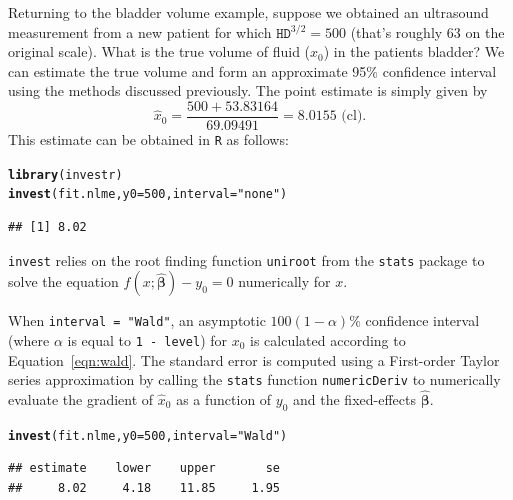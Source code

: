 \documentclass{article}\usepackage[]{graphicx}\usepackage[]{color}
\makeatletter
\newcommand{\hlnum}[1]{\textcolor[rgb]{0.686,0.059,0.569}{#1}}%
\newcommand{\hlstr}[1]{\textcolor[rgb]{0.192,0.494,0.8}{#1}}%
\newcommand{\hlstd}[1]{\textcolor[rgb]{0.345,0.345,0.345}{#1}}%
\newcommand{\hlkwc}[1]{\textcolor[rgb]{0.333,0.667,0.333}{#1}}%
\newcommand{\hlkwd}[1]{\textcolor[rgb]{0.737,0.353,0.396}{\textbf{#1}}}%
\newenvironment{kframe}{%
 \def\at@end@of@kframe{}%
 \ifinner\ifhmode%
  \def\at@end@of@kframe{\end{minipage}}%
  \begin{minipage}{\columnwidth}%
 \fi\fi%
 \def\FrameCommand##1{\hskip\@totalleftmargin \hskip-\fboxsep
 \colorbox{shadecolor}{##1}\hskip-\fboxsep
     \hskip-\linewidth \hskip-\@totalleftmargin \hskip\columnwidth}%
 \MakeFramed {\advance\hsize-\width
   \@totalleftmargin\z@ \linewidth\hsize
   \@setminipage}}%
 {\par\unskip\endMakeFramed%
 \at@end@of@kframe}
\newenvironment{knitrout}{}{} %
\makeatother
\begin{document}
Returning to the bladder volume example, suppose we obtained an ultrasound measurement from a new patient for which $\texttt{HD}^{3/2} = 500$ (that's roughly 63 on the original scale).  What is the true volume of fluid ($x_0$) in the patients bladder?  We can estimate the true volume and form an approximate 95\% confidence interval using the methods discussed previously.  The point estimate is simply given by
\[
  \widehat{x}_0 = \frac{500 + 53.83164}{69.09491} = 8.0155 \text{ (cl)}.
\]
This estimate can be obtained in \texttt{R} as follows:
\begin{knitrout}
\color{fgcolor}\begin{kframe}
\begin{alltt}
\hlkwd{library}\hlstd{(investr)}
\hlkwd{invest}\hlstd{(fit.nlme,} \hlkwc{y0} \hlstd{=} \hlnum{500}\hlstd{,} \hlkwc{interval} \hlstd{=} \hlstr{"none"}\hlstd{)}
\end{alltt}
\begin{verbatim}
## [1] 8.02
\end{verbatim}
\end{kframe}
\end{knitrout}
\texttt{invest} relies on the root finding function \texttt{uniroot} from the \texttt{stats} package to solve the equation $f\left(x; \widehat{\bm{\beta}}\right) - y_0 = 0$ numerically for $x$.  

When \texttt{interval = "Wald"}, an asymptotic $100(1-\alpha)\%$ confidence interval (where $\alpha$ is equal to \texttt{1 - level}) for $x_0$ is calculated according to Equation~\eqref{eqn:wald}. The standard error is computed using a First-order Taylor series approximation by calling the \texttt{stats} function \texttt{numericDeriv} to numerically evaluate the gradient of $\widehat{x}_0$ as a function of $y_0$ and the fixed-effects $\widehat{\bm{\beta}}$.
\begin{knitrout}
\color{fgcolor}\begin{kframe}
\begin{alltt}
\hlkwd{invest}\hlstd{(fit.nlme,} \hlkwc{y0} \hlstd{=} \hlnum{500}\hlstd{,} \hlkwc{interval} \hlstd{=} \hlstr{"Wald"}\hlstd{)}
\end{alltt}
\begin{verbatim}
## estimate    lower    upper       se 
##     8.02     4.18    11.85     1.95
\end{verbatim}
\end{kframe}
\end{knitrout}
\end{document}
